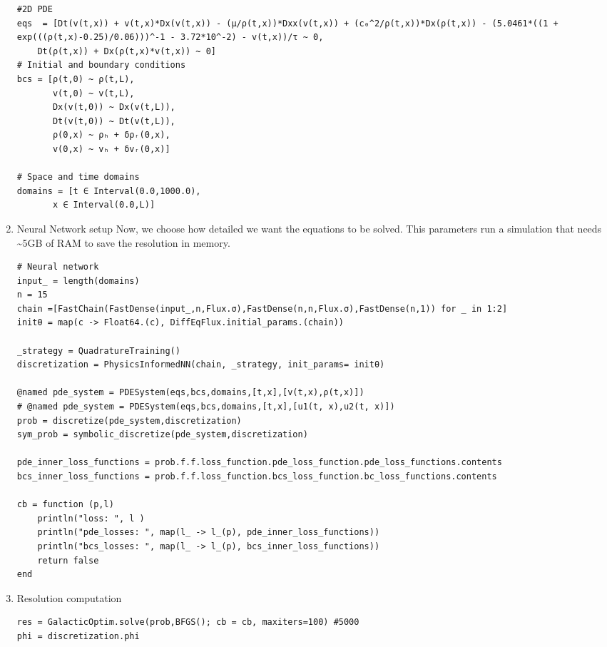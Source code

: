 \documentclass[11pt]{article}
\begin{document}
\begin{enumerate}
\begin{verbatim}
#2D PDE
eqs  = [Dt(v(t,x)) + v(t,x)*Dx(v(t,x)) - (μ/ρ(t,x))*Dxx(v(t,x)) + (c₀^2/ρ(t,x))*Dx(ρ(t,x)) - (5.0461*((1 + exp(((ρ(t,x)-0.25)/0.06)))^-1 - 3.72*10^-2) - v(t,x))/τ ~ 0,
	Dt(ρ(t,x)) + Dx(ρ(t,x)*v(t,x)) ~ 0]
# Initial and boundary conditions
bcs = [ρ(t,0) ~ ρ(t,L),
       v(t,0) ~ v(t,L),
       Dx(v(t,0)) ~ Dx(v(t,L)),
       Dt(v(t,0)) ~ Dt(v(t,L)),
       ρ(0,x) ~ ρₕ + δρᵣ(0,x),
       v(0,x) ~ vₕ + δvᵣ(0,x)]

# Space and time domains
domains = [t ∈ Interval(0.0,1000.0),
	   x ∈ Interval(0.0,L)]
\end{verbatim}

\item Neural Network setup
\label{sec:orgd61ddd2}
Now, we choose how detailed we want the equations to be solved. This parameters
run a simulation that needs \textasciitilde{}5GB of RAM to save the resolution in memory.

\begin{verbatim}
# Neural network
input_ = length(domains)
n = 15
chain =[FastChain(FastDense(input_,n,Flux.σ),FastDense(n,n,Flux.σ),FastDense(n,1)) for _ in 1:2]
initθ = map(c -> Float64.(c), DiffEqFlux.initial_params.(chain))

_strategy = QuadratureTraining()
discretization = PhysicsInformedNN(chain, _strategy, init_params= initθ)

@named pde_system = PDESystem(eqs,bcs,domains,[t,x],[v(t,x),ρ(t,x)])
# @named pde_system = PDESystem(eqs,bcs,domains,[t,x],[u1(t, x),u2(t, x)])
prob = discretize(pde_system,discretization)
sym_prob = symbolic_discretize(pde_system,discretization)

pde_inner_loss_functions = prob.f.f.loss_function.pde_loss_function.pde_loss_functions.contents
bcs_inner_loss_functions = prob.f.f.loss_function.bcs_loss_function.bc_loss_functions.contents

cb = function (p,l)
    println("loss: ", l )
    println("pde_losses: ", map(l_ -> l_(p), pde_inner_loss_functions))
    println("bcs_losses: ", map(l_ -> l_(p), bcs_inner_loss_functions))
    return false
end
\end{verbatim}

\item Resolution computation
\label{sec:org79582cd}
\begin{verbatim}
res = GalacticOptim.solve(prob,BFGS(); cb = cb, maxiters=100) #5000
phi = discretization.phi


\end{verbatim}
\end{enumerate}
\end{document}
